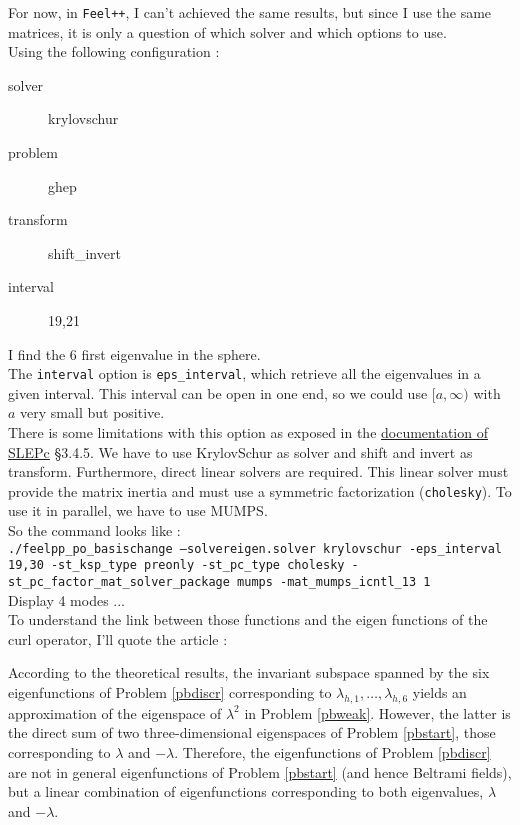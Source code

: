For now, in \texttt{Feel++}, I can't achieved the same results, but since I use the same matrices, it is only a question of which solver and which options to use.\\
Using the following configuration :
\begin{description}
\item[solver] krylovschur
\item[problem] ghep
\item[transform] shift\_invert
\item[interval] 19,21
\end{description}
I find the 6 first eigenvalue in the sphere.\\
The \texttt{interval}  option is \texttt{eps\_interval}, which retrieve all the eigenvalues in a given interval. This interval can be open in one end, so we could use $[a, \infty)$ with $a$ very small but positive.\\
There is some limitations with this option as exposed in the \href{http://slepc.upv.es/documentation/slepc.pdf}{documentation of SLEPc} \S 3.4.5. We have to use KrylovSchur as solver and shift and invert as transform. Furthermore, direct linear solvers are required. This linear solver must provide the matrix inertia and must use a symmetric factorization (\texttt{cholesky}). To use it in parallel, we have to use MUMPS.\\
So the command looks like :\\ \texttt{./feelpp\_po\_basischange --solvereigen.solver krylovschur -eps\_interval 19,30 -st\_ksp\_type preonly -st\_pc\_type cholesky -st\_pc\_factor\_mat\_solver\_package mumps -mat\_mumps\_icntl\_13 1}\\

Display 4 modes ...\\

To understand the link between those functions and the eigen functions of the curl operator, I'll quote the article \cite{Venegas2013} :
\begin{italicquotes}
  According to the theoretical results, the invariant subspace spanned by the six eigenfunctions of Problem \ref{pbdiscr} corresponding to $\lambda_{h,1},\dots,\lambda_{h,6}$ yields an approximation of the eigenspace of $\lambda^2$ in Problem \ref{pbweak}. However, the latter is the direct sum of two three-dimensional eigenspaces of Problem \ref{pbstart}, those corresponding to $\lambda$ and $-\lambda$. Therefore, the eigenfunctions of Problem \ref{pbdiscr} are not in general eigenfunctions of Problem \ref{pbstart} (and hence Beltrami fields), but a linear combination of eigenfunctions corresponding to both eigenvalues, $\lambda$ and $-\lambda$.
\end{italicquotes}

